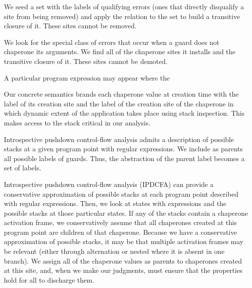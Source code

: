 \documentclass{sigplanconf}
\begin{document}
We seed a set with the labels of qualifying errors (ones that directly disqualify a site from being removed)
and apply the relation to the set to build a transitive closure of it.
These sites cannot be removed.

We look for the special class of errors that occur when a guard does not chaperone its arguments.
We find all of the chaperone sites it installs and the transitive closure of it.
These sites cannot be demoted.

A particular program expression may appear where the 

Our concrete semantics brands each chaperone value at creation time with the label of its creation site and the label of the creation site of the chaperone in which dynamic extent of the application takes place using stack inspection. This makes access to the stack critical in our analysis.

Introspective pushdown control-flow analysis admits a description of possible stacks at a given program point with regular expressions. We include as parents all possible labels of guards. Thus, the abstraction of the parent label becomes a set of labels.



Introspective pushdown control-flow analysis (IPDCFA) can provide a conservative approximation of possible stacks at each program point described with regular expressions. Then, we look at states with expressions  and the possible stacks at those particular states. If any of the stacks contain a chaperone activation frame, we conservatively assume that all chaperones created at this program point are children of that chaperone. Because we have a conservative approximation of possible stacks, it may be that multiple activation frames may be relevant (either through alternation or nested where it is absent in one branch). We assign all of the chaperone values as parents to chaperones created at this site, and, when we make our judgments, must ensure that the properties hold for all to discharge them.
\end{document}
